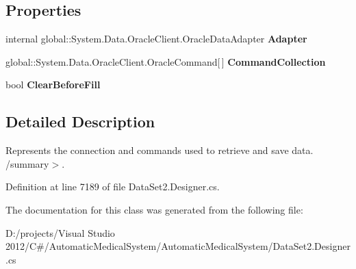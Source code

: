 \subsection*{Properties}
\begin{CompactItemize}
\item 
internal global::System.Data.OracleClient.OracleDataAdapter \textbf{Adapter}\hspace{0.3cm}{\tt  [get]}\label{class_automatic_medical_system_1_1_data_set2_table_adapters_1_1_d_o_c_t_o_r_s_table_adapter_2600ab73cf1762fc9f62672901aa911b}

\item 
global::System.Data.OracleClient.OracleCommand[$\,$] \textbf{CommandCollection}\hspace{0.3cm}{\tt  [get]}\label{class_automatic_medical_system_1_1_data_set2_table_adapters_1_1_d_o_c_t_o_r_s_table_adapter_2b4f8c0068ac7cb1443b3bebfca9b437}

\item 
bool \textbf{ClearBeforeFill}\hspace{0.3cm}{\tt  [get, set]}\label{class_automatic_medical_system_1_1_data_set2_table_adapters_1_1_d_o_c_t_o_r_s_table_adapter_6c1f8f0bde6559912de626796b358c4f}

\end{CompactItemize}


\subsection{Detailed Description}
Represents the connection and commands used to retrieve and save data. /summary$>$. 

Definition at line 7189 of file DataSet2.Designer.cs.

The documentation for this class was generated from the following file:\begin{CompactItemize}
\item 
D:/projects/Visual Studio 2012/C\#/AutomaticMedicalSystem/AutomaticMedicalSystem/DataSet2.Designer.cs\end{CompactItemize}
